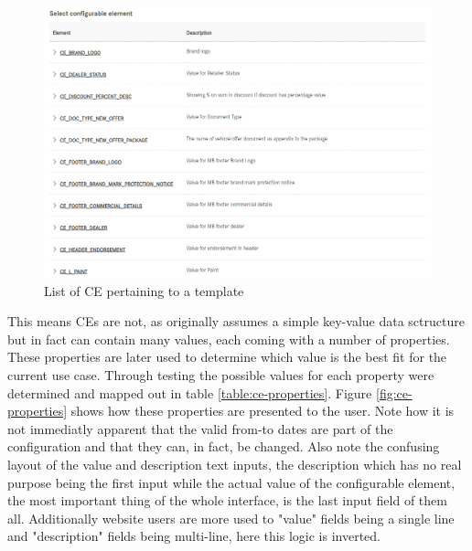 \begin{figure}
  \centering
  \includegraphics[width=0.75\linewidth]{assets/pos-ce-config-2.png}
  \caption{List of CE pertaining to a template}
  \label{fig:pos:c}
\end{figure}

This means CEs are not, as originally assumes a simple key-value data sctructure but in fact can contain many values, each coming with a number of properties. These properties are later used to determine which value is the best fit for the current use case. Through testing the possible values for each property were determined and mapped out in table \ref{table:ce-properties}. Figure \ref{fig:ce-properties} shows how these properties are presented to the user. Note how it is not immediatly apparent that the valid from-to dates are part of the configuration and that they can, in fact, be changed. Also note the confusing layout of the value and description text inputs, the description which has no real purpose being the first input while the actual value of the configurable element, the most important thing of the whole interface, is the last input field of them all. Additionally website users are more used to "value" fields being a single line and "description" fields being multi-line, here this logic is inverted.

